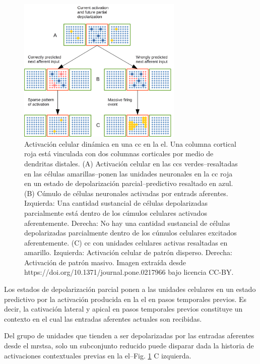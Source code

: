 {\begin{figure}[h!]
    \centering
    \includegraphics[width=0.7\textwidth]{Activation.png}
    \caption{Activación celular dinámica en una \gls{cc} en la \gls{el}.
	    Una columna cortical roja está vinculada con dos columnas corticales por medio de dendritas distales.
	    (A) Activación celular en las \glspl{cc} verdes--resaltadas en las células amarillas--ponen las unidades neuronales
	    en la \gls{cc} roja en un estado de depolarización parcial--predictivo resaltado en azul.
	    (B) Cúmulo de células neuronales activadas por entrads aferentes.
	    Izquierda: Una cantidad sustancial de células depolarizadas parcialmente está dentro de los cúmulos celulares activados aferentemente.
	    Derecha: No hay una cantidad sustancial de células depolarizadas parcialmente dentro de los cúmulos celulares excitados aferentemente.
	    (C) \gls{cc} con unidades celulares activas resaltadas en amarillo.
	    Izquierda: Activación celular de patrón disperso.
	    Derecha: Activación de patrón masivo.
    Imagen extraída desde https://doi.org/10.1371/journal.pone.0217966 bajo licencia CC-BY.}
    \label{fig:Activation}
\end{figure}

Los estados de depolarización parcial ponen a las unidades celulares en un estado predictivo por
la activación producida en la \gls{el} en pasos temporales previos.
Es decir, la cativación lateral y apical en pasos temporales previos constituye un contexto en el cual
las entradas aferentes actuales son recibidas.

Del grupo de unidades que tienden a ser depolarizadas por las entradas aferentes desde el \gls{mrstsa},
solo un subconjunto reducido puede disparar dada la historia de activaciones contextuales previas
en la  \gls{el}--Fig. \ref{fig:Activation} C izquierda.

}

